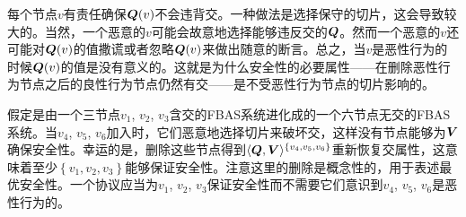 每个节点$v$有责任确保${\bm Q}(v)$不会违背{\quorum}交。一种做法是选择保守的切片，这会导致较大的{\quorum}。当然，一个恶意的$v$可能会故意地选择能够违反{\quorum}交的${\bm Q}$。然而一个恶意的$v$还可能对${\bm Q}(v)$的值撒谎或者忽略${\bm Q}(v)$来做出随意的断言。总之，当$v$是恶性行为的时候${\bm Q}(v)$的值是没有意义的。这就是为什么安全性的必要属性——在删除恶性行为节点之后的良性行为节点仍然有{\quorum}交——是不受恶性行为节点的切片影响的。

假定是由一个三节点$v_1$, $v_2$, $v_3$含{\quorum}交的FBAS系统进化成的一个六节点无{\quorum}交的FBAS系统。当$v_4$, $v_5$, $v_6$加入时，它们恶意地选择切片来破坏{\quorum}交，这样没有节点能够为${\bm V}$确保安全性。幸运的是，删除这些节点得到$\langle{\bm Q},{\bm V}\rangle^{\left\{v_4,v_5,v_6\right\}}$重新恢复{\quorum}交属性，这意味着至少$\left\{v_1,v_2,v_3\right\}$能够保证安全性。注意这里的删除是概念性的，用于表述最优安全性。一个协议应当为$v_1$, $v_2$, $v_3$保证安全性而不需要它们意识到$v_4$, $v_5$, $v_6$是恶性行为的。
